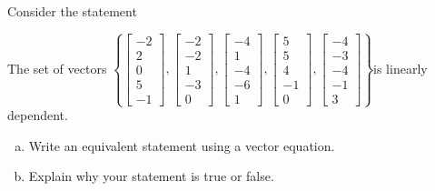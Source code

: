 
\begin{exerciseStatement}


Consider the statement 
\begin{center}\begin{minipage}{0.8\textwidth}
 The set of vectors \( \left\{ \left[\begin{array}{c}
-2 \\
2 \\
0 \\
5 \\
-1
\end{array}\right] , \left[\begin{array}{c}
-2 \\
-2 \\
1 \\
-3 \\
0
\end{array}\right] , \left[\begin{array}{c}
-4 \\
1 \\
-4 \\
-6 \\
1
\end{array}\right] , \left[\begin{array}{c}
5 \\
5 \\
4 \\
-1 \\
0
\end{array}\right] , \left[\begin{array}{c}
-4 \\
-3 \\
-4 \\
-1 \\
3
\end{array}\right] \right\} \)is linearly dependent.
\end{minipage}\end{center}
    


\begin{enumerate}[(a)]
\item  Write an equivalent statement using a vector equation.
\item  Explain why your statement is true or false.
\end{enumerate}
    
\end{exerciseStatement}
    
